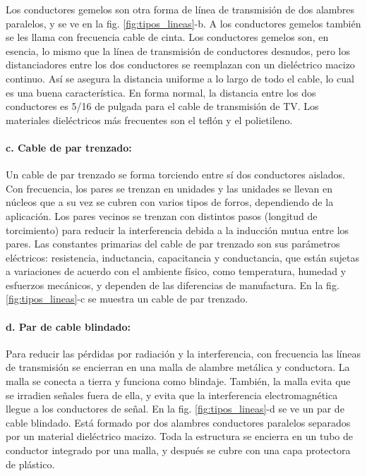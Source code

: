             Los conductores gemelos son otra forma de línea de transmisión de dos alambres paralelos, y se ve en la fig. \ref{fig:tipos_lineas}-b. A los conductores gemelos también se les llama con frecuencia cable de cinta. Los conductores gemelos son, en esencia, lo mismo que la línea de transmisión de conductores desnudos, pero los distanciadores entre los dos conductores se reemplazan con un dieléctrico macizo continuo. Así se asegura la distancia uniforme a lo largo de todo el cable, lo cual es una buena característica. En forma normal, la distancia entre los dos conductores es 5/16 de pulgada para el cable de transmisión de TV. Los materiales dieléctricos más frecuentes son el teflón y el polietileno.

            \paragraph{c. Cable de par trenzado:}

            Un cable de par trenzado se forma torciendo entre sí dos conductores aislados. Con frecuencia, los pares se trenzan en unidades y las unidades se llevan en núcleos que a su vez se cubren con varios tipos de forros, dependiendo de la aplicación. Los pares vecinos se trenzan con distintos pasos (longitud de torcimiento) para reducir la interferencia debida a la inducción mutua entre los pares. Las constantes primarias del cable de par trenzado son sus parámetros eléctricos: resistencia, inductancia, capacitancia y conductancia, que están sujetas a variaciones de acuerdo con el ambiente físico, como temperatura, humedad y esfuerzos mecánicos, y dependen de las diferencias de manufactura. En la fig. \ref{fig:tipos_lineas}-c se muestra un cable de par trenzado.

            \paragraph{d. Par de cable blindado:}

            Para reducir las pérdidas por radiación y la interferencia, con frecuencia las líneas de transmisión se encierran en una malla de alambre metálica y conductora. La malla se conecta a tierra y funciona como blindaje. También, la malla evita que se irradien señales fuera de ella, y evita que la interferencia electromagnética llegue a los conductores de señal. En la fig. \ref{fig:tipos_lineas}-d se ve un par de cable blindado. Está formado por dos alambres conductores paralelos separados por un material dieléctrico macizo. Toda la estructura se encierra en un tubo de conductor integrado por una malla, y después se cubre con una capa protectora de plástico.


